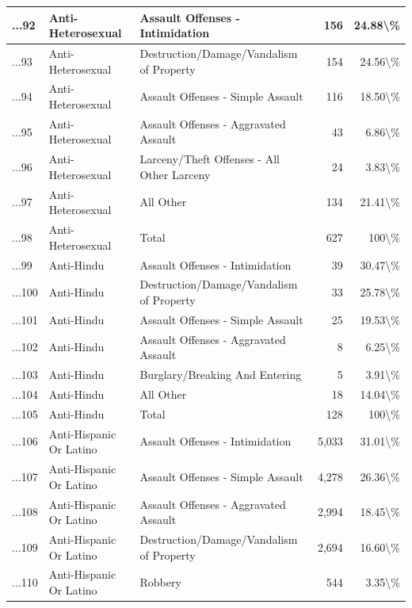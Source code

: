 \documentclass[
]{krantz}
\begin{document}
\begin{longtable}[t]{l|l|l|r|r}
\hline
...92 & Anti-Heterosexual & Assault Offenses - Intimidation & 156 & 24.88\textbackslash{}\%\\
\hline
...93 & Anti-Heterosexual & Destruction/Damage/Vandalism of Property & 154 & 24.56\textbackslash{}\%\\
\hline
...94 & Anti-Heterosexual & Assault Offenses - Simple Assault & 116 & 18.50\textbackslash{}\%\\
\hline
...95 & Anti-Heterosexual & Assault Offenses - Aggravated Assault & 43 & 6.86\textbackslash{}\%\\
\hline
...96 & Anti-Heterosexual & Larceny/Theft Offenses - All Other Larceny & 24 & 3.83\textbackslash{}\%\\
\hline
...97 & Anti-Heterosexual & All Other & 134 & 21.41\textbackslash{}\%\\
\hline
...98 & Anti-Heterosexual & Total & 627 & 100\textbackslash{}\%\\
\hline
...99 & Anti-Hindu & Assault Offenses - Intimidation & 39 & 30.47\textbackslash{}\%\\
\hline
...100 & Anti-Hindu & Destruction/Damage/Vandalism of Property & 33 & 25.78\textbackslash{}\%\\
\hline
...101 & Anti-Hindu & Assault Offenses - Simple Assault & 25 & 19.53\textbackslash{}\%\\
\hline
...102 & Anti-Hindu & Assault Offenses - Aggravated Assault & 8 & 6.25\textbackslash{}\%\\
\hline
...103 & Anti-Hindu & Burglary/Breaking And Entering & 5 & 3.91\textbackslash{}\%\\
\hline
...104 & Anti-Hindu & All Other & 18 & 14.04\textbackslash{}\%\\
\hline
...105 & Anti-Hindu & Total & 128 & 100\textbackslash{}\%\\
\hline
...106 & Anti-Hispanic Or Latino & Assault Offenses - Intimidation & 5,033 & 31.01\textbackslash{}\%\\
\hline
...107 & Anti-Hispanic Or Latino & Assault Offenses - Simple Assault & 4,278 & 26.36\textbackslash{}\%\\
\hline
...108 & Anti-Hispanic Or Latino & Assault Offenses - Aggravated Assault & 2,994 & 18.45\textbackslash{}\%\\
\hline
...109 & Anti-Hispanic Or Latino & Destruction/Damage/Vandalism of Property & 2,694 & 16.60\textbackslash{}\%\\
\hline
...110 & Anti-Hispanic Or Latino & Robbery & 544 & 3.35\textbackslash{}\%\\

\end{longtable}
\end{document}
